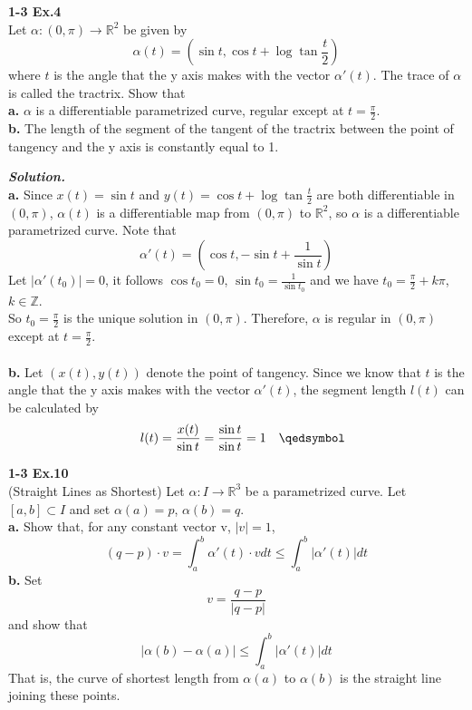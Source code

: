 \documentclass{article}
\begin{document}
\par
\textbf{1-3 Ex.4}\\
Let $\alpha: (0, \pi) \to \mathbb{R}^2$ be given by
$$
    \alpha(t) = (\sin t, \cos t + \log{\tan{\frac{t}{2}}})
$$
where $t$ is the angle that the y axis makes with the vector $\alpha'(t)$. The trace of $\alpha$ is 
called the tractrix. Show that\\
\textbf{a.} $\alpha$ is a differentiable parametrized curve, regular except at $t=\frac{\pi}{2}$.\\
\textbf{b.} The length of the segment of the tangent of the tractrix between the point of tangency and the y
axis is constantly equal to 1.

\par
\textbf{\textit{Solution.}}\\
\textbf{a. }Since $x(t) = \sin t$ and $y(t) = \cos t + \log{\tan{\frac{t}{2}}}$ are both differentiable in $(0, \pi)$,
$\alpha(t)$ is a differentiable map from $(0, \pi)$ to $\mathbb{R}^2$, so $\alpha$ is a differentiable
parametrized curve. Note that
$$
    \alpha'(t) = (\cos t, -\sin t + \frac{1}{\sin t})
$$
Let $|\alpha'(t_0)| = 0$, it follows $\cos t_0 = 0$, $\sin t_0 = \frac{1}{\sin t_0}$ and we have $t_0 = \frac{\pi}{2} + k\pi$, $k \in \mathbb{Z}$.\\
So $t_0 = \frac{\pi}{2}$ is the unique solution in $(0, \pi)$. Therefore, $\alpha$ is regular in $(0, \pi)$ except at $t = \frac{\pi}{2}$. \quad \qedsymbol\\\\
\textbf{b. } Let $(x(t), y(t))$ denote the point of tangency. Since we know that $t$ is the angle that the y axis makes with the vector
$\alpha'(t)$, the segment length $l(t)$ can be calculated by
$$
    \quad l(t) = \frac{x(t)}{\sin t} = \frac{\sin t}{\sin t} = 1 \quad \qedsymbol
$$

\par
\textbf{1-3 Ex.10}\\
(Straight Lines as Shortest) Let $\alpha: I \to \mathbb{R}^3$ be a parametrized curve. Let $[a, b] \subset I$ and set $\alpha(a) = p$, $\alpha(b) = q$.\\
\textbf{a. }Show that, for any constant vector v, $|v| = 1$,
$$
    (q - p) \cdot v = \int_a^b \alpha'(t) \cdot v dt \leq \int_a^b |\alpha'(t)|dt
$$
\textbf{b. }Set
$$
    v = \frac{q - p}{|q - p|}
$$
and show that
$$
    |\alpha(b) - \alpha(a)| \leq \int_a^b |\alpha'(t)|dt
$$
That is, the curve of shortest length from $\alpha(a)$ to $\alpha(b)$ is the straight line joining these points.
\end{document}
